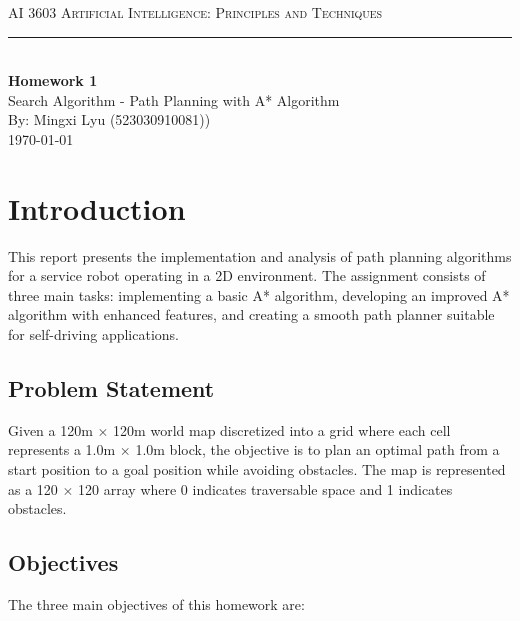 \documentclass[aps,letterpaper,10pt]{revtex4}
\newcommand{\labtitle}{AI 3603 Artificial Intelligence: Principles and Techniques}
\newcommand{\authorname}{Mingxi Lyu (523030910081))}
\newcommand{\hw}{1}
\newcommand{\hwtitle}{Search Algorithm - Path Planning with A* Algorithm}
\begin{document}
\begin{titlepage}
\begin{center}
{\Large \textsc{\labtitle} \\ \vspace{4pt}}
\rule[13pt]{\textwidth}{1pt} \\ \vspace{80pt}
{\LARGE \textbf{Homework \hw} \\ \vspace{10pt}}
{\Large \hwtitle \\ \vspace{150pt}}
{\large By: \authorname \\ \vspace{10pt}
\today}
\end{center}
\end{titlepage}

\section{Introduction}

This report presents the implementation and analysis of path planning algorithms for a service robot operating in a 2D environment. The assignment consists of three main tasks: implementing a basic A* algorithm, developing an improved A* algorithm with enhanced features, and creating a smooth path planner suitable for self-driving applications.

\subsection{Problem Statement}

Given a 120m $\times$ 120m world map discretized into a grid where each cell represents a 1.0m $\times$ 1.0m block, the objective is to plan an optimal path from a start position to a goal position while avoiding obstacles. The map is represented as a 120 $\times$ 120 array where 0 indicates traversable space and 1 indicates obstacles.

\subsection{Objectives}

The three main objectives of this homework are:
\end{document}
